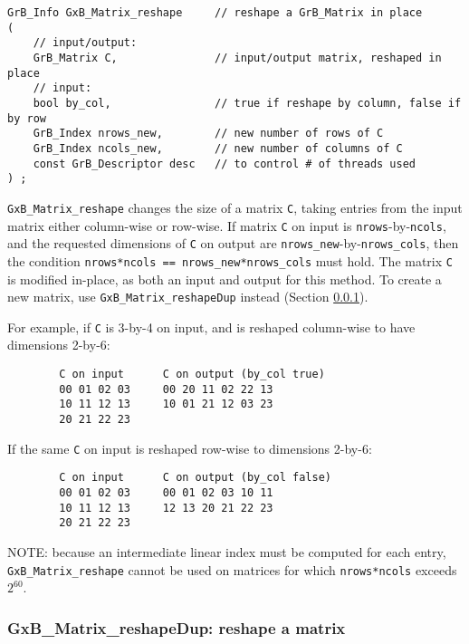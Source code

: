\documentclass[12pt]{article}
\begin{document}
\begin{mdframed}[userdefinedwidth=6in]
{\footnotesize
\begin{verbatim}
GrB_Info GxB_Matrix_reshape     // reshape a GrB_Matrix in place
(
    // input/output:
    GrB_Matrix C,               // input/output matrix, reshaped in place
    // input:
    bool by_col,                // true if reshape by column, false if by row
    GrB_Index nrows_new,        // new number of rows of C
    GrB_Index ncols_new,        // new number of columns of C
    const GrB_Descriptor desc   // to control # of threads used
) ;
\end{verbatim} } \end{mdframed}

\verb'GxB_Matrix_reshape' changes the size of a matrix \verb'C', taking entries
from the input matrix either column-wise or row-wise.  If matrix \verb'C' on
input is \verb'nrows'-by-\verb'ncols', and the requested dimensions of
\verb'C' on output are \verb'nrows_new'-by-\verb'nrows_cols', then
the condition \verb'nrows*ncols == nrows_new*nrows_cols' must hold.
The matrix \verb'C' is modified in-place, as both an input and output for
this method.  To create a new matrix, use \verb'GxB_Matrix_reshapeDup'
instead (Section \ref{matrix_reshapedup}).

For example, if \verb'C' is 3-by-4 on input, and is reshaped column-wise to
have dimensions 2-by-6:

\begin{verbatim}
        C on input      C on output (by_col true)
        00 01 02 03     00 20 11 02 22 13
        10 11 12 13     10 01 21 12 03 23
        20 21 22 23
\end{verbatim}

If the same \verb'C' on input is reshaped row-wise to dimensions 2-by-6:

\begin{verbatim}
        C on input      C on output (by_col false)
        00 01 02 03     00 01 02 03 10 11
        10 11 12 13     12 13 20 21 22 23
        20 21 22 23
\end{verbatim}

NOTE: because an intermediate linear index must be computed for each entry,
\verb'GxB_Matrix_reshape' cannot be used on matrices for which
\verb'nrows*ncols' exceeds $2^{60}$.

\newpage
\subsubsection{{\sf GxB\_Matrix\_reshapeDup:} reshape a matrix}
\label{matrix_reshapedup}
\end{document}
